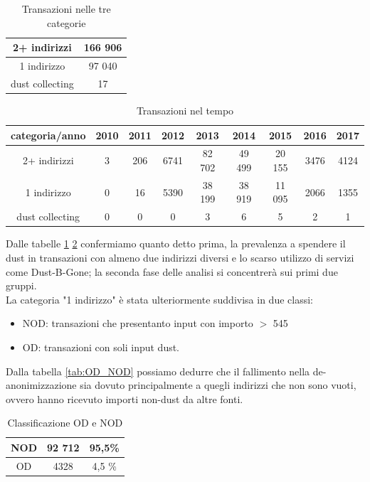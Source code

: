 \begin{table}[H]
    \centering
    \begin{tabular}{|c|c|}
        \hline
        2+ indirizzi & 166 906\\
        \hline
        1 indirizzo & 97 040\\
        \hline
        dust collecting & 17\\
        \hline
    \end{tabular}
    \caption{Transazioni nelle tre categorie}
    \label{tab:tx_categories}
\end{table}
\begin{table}[H]
    \centering
    \begin{tabular}{|c|c|c|c|c|c|c|c|c|}
        \hline
            categoria/anno  & 2010 & 2011 & 2012 & 2013 & 2014 & 2015 & 2016 & 2017\\
        \hline 
         2+ indirizzi &  3 & 206 & 6741 & 82 702 & 49 499 & 20 155 & 3476 & 4124 \\
         \hline
         1 indirizzo & 0 & 16 & 5390 & 38 199 & 38 919 & 11 095 & 2066 & 1355  \\
         \hline
         dust collecting & 0 & 0 & 0 & 3 & 6 & 5 & 2 & 1 \\
         \hline
    \end{tabular}
    \caption{Transazioni nel tempo}
    \label{tab:tx_categories_year}
\end{table}
Dalle tabelle \ref{tab:tx_categories} \ref{tab:tx_categories_year} confermiamo quanto detto prima, la prevalenza a spendere il dust in transazioni con almeno due indirizzi diversi e lo scarso utilizzo di servizi come Dust-B-Gone; la seconda fase delle analisi si concentrerà sui primi due gruppi.\\
La categoria "1 indirizzo" è stata ulteriormente suddivisa in due classi:
\begin{itemize}
    \item NOD: transazioni che presentanto input con importo $>$ 545  
    \item OD: transazioni con soli input dust.
\end{itemize}
Dalla tabella \ref{tab:OD_NOD} possiamo dedurre che il fallimento nella de-anonimizzazione sia dovuto principalmente a quegli indirizzi che non sono vuoti, ovvero hanno ricevuto importi non-dust da altre fonti. 
\begin{table}[H]
    \centering
    \begin{tabular}{|c|c|c|}
        \hline
            NOD  & 92 712 & 95,5\%\\
        \hline 
            OD  & 4328 & 4,5 \%\\
        \hline
    \end{tabular}
    \caption{Classificazione OD e NOD}
    \label{tab:OD_NOD_failed}
\end{table}
